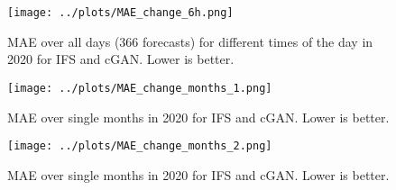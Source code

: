 \documentclass[12pt]{article}
\begin{document}
\begin{figure}
\begin{center}
\texttt{[image: ../plots/MAE\_change\_6h.png]}
\end{center}
\caption{MAE over all days (366 forecasts) for different times of the day in 2020 for IFS and cGAN. Lower is better.}
\end{figure}


\begin{figure}
\begin{center}
\texttt{[image: ../plots/MAE\_change\_months\_1.png]}
\end{center}
\caption{MAE over single months in 2020 for IFS and cGAN. Lower is better.}
\end{figure}

\begin{figure}
\begin{center}
\texttt{[image: ../plots/MAE\_change\_months\_2.png]}
\end{center}
\caption{MAE over single months in 2020 for IFS and cGAN. Lower is better.}
\end{figure}
\end{document}
